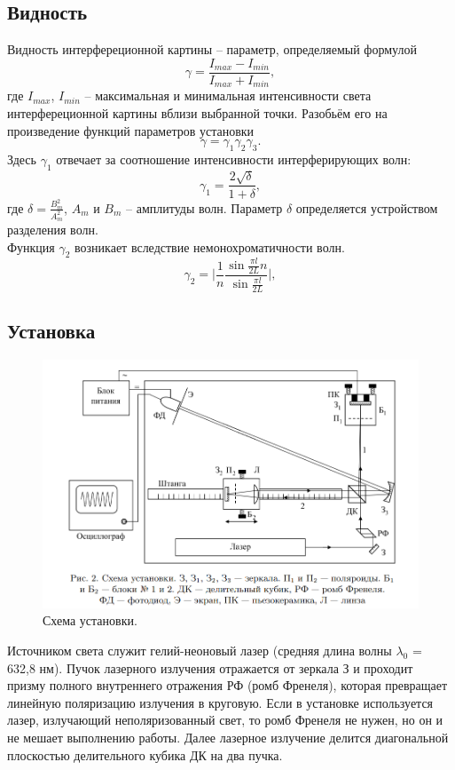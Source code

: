 \documentclass[a4paper, 12pt]{article}%
\begin{document}
\subsection*{Видность}
Видность интерфереционной картины -- параметр, определяемый формулой
\begin{equation}
\gamma = \dfrac{I_{max} - I_{min}}{I_{max} + I_{min}},
\end{equation}
где $I_{max}$, $I_{min}$ -- максимальная и минимальная интенсивности света интерфереционной картины вблизи выбранной точки. Разобьём его на произведение функций параметров установки
$$
\gamma = \gamma_1 \gamma_2 \gamma_3.
$$
Здесь $\gamma_1$ отвечает за соотношение интенсивности интерферирующих волн:
\begin{equation}
\gamma_1 = \dfrac{2\sqrt{\delta}}{1+\delta},
\end{equation}
где $\delta = \frac{B_m^2}{A_m^2}$, $A_m$ и $B_m$ -- амплитуды волн. Параметр $\delta$ определяется устройством разделения волн.\\
Функция $\gamma_2$ возникает вследствие немонохроматичности волн.
\begin{equation}
	\gamma_2 = \bigg | \frac{1}{n}\frac{\sin\frac{\pi l}{2L}n}{\sin\frac{\pi l}{2L}} \bigg |,
\end{equation}

\subsection*{Установка}
\begin{figure}[h]
\includegraphics[scale=0.75]{2.png}
\centering
\caption{Схема установки.}
\end{figure}
Источником света служит гелий-неоновый лазер (средняя длина волны $\lambda_0$ = 632,8 нм). Пучок лазерного излучения отражается от зеркала З и проходит призму полного внутреннего отражения РФ (ромб Френеля), которая превращает линейную поляризацию излучения в круговую. Если в установке используется лазер, излучающий неполяризованный свет, то ромб Френеля не нужен, но он и не мешает выполнению работы. Далее лазерное излучение делится диагональной плоскостью делительного кубика ДК на два пучка.
\end{document}
